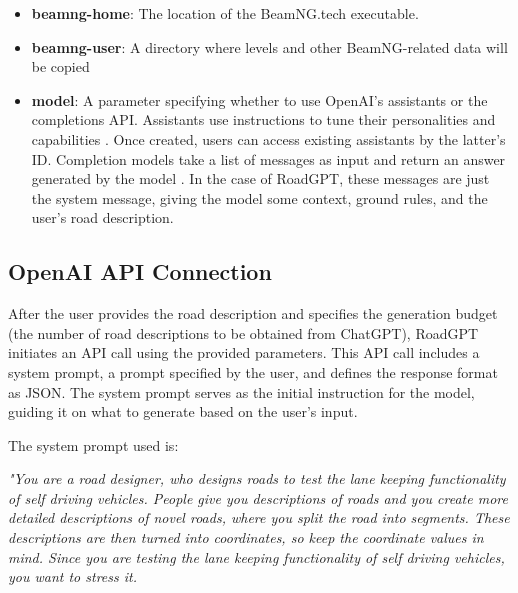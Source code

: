 \begin{itemize}
    \item \textbf{beamng-home}: The location of the BeamNG.tech executable.
    \item \textbf{beamng-user}: A directory where levels and other BeamNG-related data will be copied
    \item \textbf{model}: A parameter specifying whether to use OpenAI's assistants or the completions API. Assistants use instructions to tune their personalities and capabilities \cite{OpenAI}. Once created, users can access existing assistants by the latter's ID. Completion models take a list of messages as input and return an answer generated by the model \cite{OpenAI}. In the case of RoadGPT, these messages are just the system message, giving the model some context, ground rules, and the user's road description.
\end{itemize}

\subsection{OpenAI API Connection}
After the user provides the road description and specifies the generation budget (the number of road descriptions to be obtained from ChatGPT), RoadGPT initiates an API call using the provided parameters. This API call includes a system prompt, a prompt specified by the user, and defines the response format as JSON. The system prompt serves as the initial instruction for the model, guiding it on what to generate based on the user's input. 

The system prompt used is: 

\textit{"You are a road designer, who designs roads to test the lane keeping functionality of self driving vehicles. People give you descriptions of roads and you create more detailed descriptions of novel roads, where you split the road into segments. These descriptions are then turned into coordinates, so keep the coordinate values in mind. Since you are testing the lane keeping functionality of self driving vehicles, you want to stress it.}

